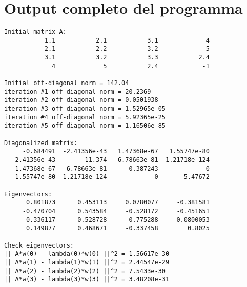 \documentclass[a4paper]{article}
\begin{document}
\section{Output completo del programma}

\begin{lstlisting}
Initial matrix A:
           1.1           2.1           3.1             4
           2.1           2.2           3.2             5
           3.1           3.2           3.3           2.4
             4             5           2.4            -1

Initial off-diagonal norm = 142.04
iteration #1 off-diagonal norm = 20.2369
iteration #2 off-diagonal norm = 0.0501938
iteration #3 off-diagonal norm = 1.52965e-05
iteration #4 off-diagonal norm = 5.92365e-25
iteration #5 off-diagonal norm = 1.16506e-85

Diagonalized matrix:
     -0.684491  -2.41356e-43   1.47368e-67   1.55747e-80
  -2.41356e-43        11.374   6.78663e-81 -1.21718e-124
   1.47368e-67   6.78663e-81      0.387243             0
   1.55747e-80 -1.21718e-124             0      -5.47672

Eigenvectors:
      0.801873      0.453113     0.0780077     -0.381581
     -0.470704      0.543584     -0.528172     -0.451651
     -0.336117      0.528728      0.775288     0.0800053
      0.149877      0.468671     -0.337458        0.8025

Check eigenvectors:
|| A*w(0) - lambda(0)*w(0) ||^2 = 1.56617e-30
|| A*w(1) - lambda(1)*w(1) ||^2 = 2.44547e-29
|| A*w(2) - lambda(2)*w(2) ||^2 = 7.5433e-30
|| A*w(3) - lambda(3)*w(3) ||^2 = 3.48208e-31

\end{lstlisting}
\end{document}
